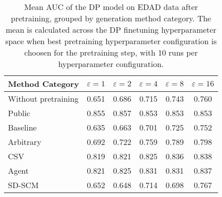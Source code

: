 \begin{table}[h!]
    \centering
    \caption{Mean AUC of the DP model on EDAD data after pretraining, grouped by generation method category. The mean is calculated across the DP finetuning hyperparameter space when best pretraining hyperparameter configuration is choosen for the pretraining step, with 10 runs per hyperparameter configuration.}
    \label{tab:epsilon_comparison}
    \begin{tabular}{lccccc}
    \toprule
    Method Category & $\varepsilon=1$ & $\varepsilon=2$ & $\varepsilon=4$ & $\varepsilon=8$ & $\varepsilon=16$ \\
    \midrule
    Without pretraining & 0.651 & 0.686 & 0.715 & 0.743 & 0.760 \\
    \arrayrulecolor{black!50!}\midrule
    Public & \cellcolor{gold!30}0.855 & \cellcolor{gold!30}0.857 & \cellcolor{gold!30}0.853 & \cellcolor{gold!30}0.853 & \cellcolor{gold!30}0.853 \\
    \arrayrulecolor{black!50!}\midrule
    Baseline & 0.635 & 0.663 & 0.701 & 0.725 & 0.752 \\
    \arrayrulecolor{black!50!}\midrule
    Arbitrary & 0.692 & 0.722 & 0.759 & 0.789 & 0.798 \\
    \arrayrulecolor{black!50!}\midrule
    CSV & \cellcolor{bronze!30}0.819 & \cellcolor{bronze!30}0.821 & \cellcolor{bronze!30}0.825 & \cellcolor{silver!30}0.836 & \cellcolor{silver!30}0.838 \\
    Agent & \cellcolor{silver!30}0.821 & \cellcolor{silver!30}0.825 & \cellcolor{silver!30}0.831 & \cellcolor{bronze!30}0.831 & \cellcolor{bronze!30}0.837 \\
    SD-SCM & 0.652 & 0.648 & 0.714 & 0.698 & 0.767 \\
    \bottomrule
    \end{tabular}
\end{table}